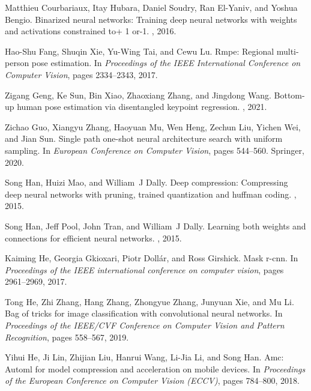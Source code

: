 \documentclass[10pt,twocolumn,letterpaper]{article}
\begin{document}
{\begin{thebibliography}{10}
Matthieu Courbariaux, Itay Hubara, Daniel Soudry, Ran El-Yaniv, and Yoshua
  Bengio.
\newblock Binarized neural networks: Training deep neural networks with weights
  and activations constrained to+ 1 or-1.
, 2016.

Hao-Shu Fang, Shuqin Xie, Yu-Wing Tai, and Cewu Lu.
\newblock Rmpe: Regional multi-person pose estimation.
\newblock In {\em Proceedings of the IEEE International Conference on Computer
  Vision}, pages 2334--2343, 2017.

Zigang Geng, Ke Sun, Bin Xiao, Zhaoxiang Zhang, and Jingdong Wang.
\newblock Bottom-up human pose estimation via disentangled keypoint regression.
, 2021.

Zichao Guo, Xiangyu Zhang, Haoyuan Mu, Wen Heng, Zechun Liu, Yichen Wei, and
  Jian Sun.
\newblock Single path one-shot neural architecture search with uniform
  sampling.
\newblock In {\em European Conference on Computer Vision}, pages 544--560.
  Springer, 2020.

Song Han, Huizi Mao, and William~J Dally.
\newblock Deep compression: Compressing deep neural networks with pruning,
  trained quantization and huffman coding.
, 2015.

Song Han, Jeff Pool, John Tran, and William~J Dally.
\newblock Learning both weights and connections for efficient neural networks.
, 2015.

Kaiming He, Georgia Gkioxari, Piotr Doll{\'a}r, and Ross Girshick.
\newblock Mask r-cnn.
\newblock In {\em Proceedings of the IEEE international conference on computer
  vision}, pages 2961--2969, 2017.

Tong He, Zhi Zhang, Hang Zhang, Zhongyue Zhang, Junyuan Xie, and Mu Li.
\newblock Bag of tricks for image classification with convolutional neural
  networks.
\newblock In {\em Proceedings of the IEEE/CVF Conference on Computer Vision and
  Pattern Recognition}, pages 558--567, 2019.

Yihui He, Ji Lin, Zhijian Liu, Hanrui Wang, Li-Jia Li, and Song Han.
\newblock Amc: Automl for model compression and acceleration on mobile devices.
\newblock In {\em Proceedings of the European Conference on Computer Vision
  (ECCV)}, pages 784--800, 2018.


\end{thebibliography}}
\end{document}
